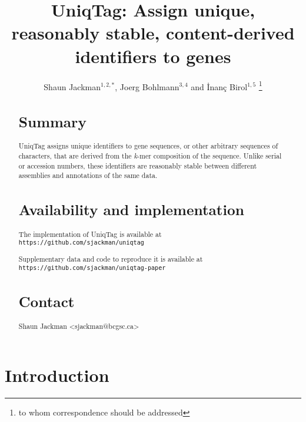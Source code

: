\documentclass{bioinfo}
\begin{document}

\title[UniqTag]{
UniqTag: Assign unique, reasonably stable, content-derived identifiers to genes}
\author[Jackman \textit{et al.}]{
Shaun Jackman$^{1,2,*}$, Joerg Bohlmann$^{3,4}$ and \.{I}nan\c{c} Birol$^{1,5}$
\footnote{to whom correspondence should be addressed}
}

\address{
$^1$Genome Sciences Centre, British Columbia Cancer Agency, Vancouver, BC V5Z 4S6, Canada
\\$^2$Department of Bioinformatics, University of British Columbia, Vancouver, BC V5Z 4S6, Canada
\\$^3$Michael Smith Laboratories, University of British Columbia, Vancouver, BC V6T 1Z4, Canada
\\$^4$Department of Forest Sciences, University of British Columbia, Vancouver, BC V6T 1Z4, Canada
\\$^5$Department of Medical Genetics, University of British Columbia, Vancouver, BC V6H 3N1, Canada
}



\maketitle

\begin{abstract}
\section{Summary}\label{summary}

UniqTag assigns unique identifiers to gene sequences, or other arbitrary
sequences of characters, that are derived from the \emph{k}-mer
composition of the sequence. Unlike serial or accession numbers, these
identifiers are reasonably stable between different assemblies and
annotations of the same data.

\section{Availability and
implementation}\label{availability-and-implementation}

The implementation of UniqTag is available
at\\\texttt{https://github.com/sjackman/uniqtag}

Supplementary data and code to reproduce it is available
at\\\texttt{https://github.com/sjackman/uniqtag-paper}

\section{Contact}\label{contact}

Shaun Jackman \textless{}sjackman@bcgsc.ca\textgreater{}

\end{abstract}\section{Introduction}\label{introduction}
\end{document}
